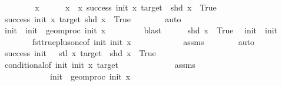 \begin{isabellebody}
\ \ \isamarkupfalse%
\isanewline
\ \ \ \ \isamarkupfalse%
\ x\isanewline
\ \ \ \ \isamarkupfalse%
\ {\isachardoublequoteopen}x\ {\isasymin}\ {\isacharbraceleft}{\kern0pt}x{\isachardot}{\kern0pt}\ success\ init\ x\ target\ {\isasymand}\ shd\ x\ {\isacharequal}{\kern0pt}\ True{\isacharbraceright}{\kern0pt}{\isachardoublequoteclose}\ \isanewline
\ \ \ \ \isamarkupfalse%
\ \isamarkupfalse%
\ {\isachardoublequoteopen}success\ init\ x\ target{\isachardoublequoteclose}{\isachardoublequoteopen}\ shd\ x\ {\isacharequal}{\kern0pt}\ True{\isachardoublequoteclose}\isanewline
\ \ \ \ \ \ \isamarkupfalse%
\ auto\isanewline
\ \ \ \ \isamarkupfalse%
\ init{\isacharprime}{\kern0pt}\ \ {\isachardoublequoteopen}init{\isacharprime}{\kern0pt}\ {\isacharequal}{\kern0pt}\ geom{\isacharunderscore}{\kern0pt}proc\ init\ x\ {}{\isachardoublequoteclose}\isanewline
\ \ \ \ \ \ \isamarkupfalse%
\ blast\isanewline
\ \ \ \ \isamarkupfalse%
\ {\isacartoucheopen}shd\ x\ {\isacharequal}{\kern0pt}\ True{\isacartoucheclose}\ \isamarkupfalse%
\ {\isachardoublequoteopen}init{\isacharprime}{\kern0pt}\ {\isacharequal}{\kern0pt}\ init\ {\isacharplus}{\kern0pt}\ {}{\isachardoublequoteclose}\isanewline
\ \ \ \ \ \ \isamarkupfalse%
\ fst{\isacharunderscore}{\kern0pt}true{\isacharunderscore}{\kern0pt}plus{\isacharunderscore}{\kern0pt}one{\isacharbrackleft}{\kern0pt}of\ init{\isacharprime}{\kern0pt}\ init\ x{\isacharbrackright}{\kern0pt}\isanewline
\ \ \ \ \ \ \ \ \ \ \ \ assms{\isacharparenleft}{\kern0pt}{}{\isacharparenright}{\kern0pt}\isanewline
\ \ \ \ \ \ \isamarkupfalse%
\ auto\isanewline
\ \ \ \ \isamarkupfalse%
\ \isamarkupfalse%
\ {\isachardoublequoteopen}success\ {\isacharparenleft}{\kern0pt}init\ {\isacharplus}{\kern0pt}\ {}{\isacharparenright}{\kern0pt}\ {\isacharparenleft}{\kern0pt}stl\ x{\isacharparenright}{\kern0pt}\ target\ {\isasymand}\ shd\ x\ {\isacharequal}{\kern0pt}\ True{\isachardoublequoteclose}\isanewline
\ \ \ \ \ \ \isamarkupfalse%
\ conditional{}{\isacharbrackleft}{\kern0pt}of\ init{\isacharprime}{\kern0pt}\ init\ x\ target{\isacharbrackright}{\kern0pt}\ \isanewline
\ \ \ \ \ \ \ \ \ \ \ \ assms\isanewline
\ \ \ \ \ \ \ \ \ \ \ \ {\isacartoucheopen}init{\isacharprime}{\kern0pt}\ {\isacharequal}{\kern0pt}\ geom{\isacharunderscore}{\kern0pt}proc\ init\ x\ {}{\isacartoucheclose}\isanewline

\end{isabellebody}

